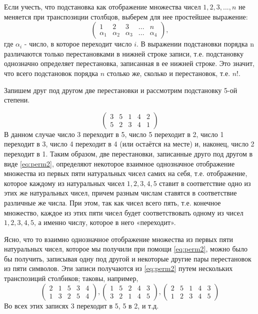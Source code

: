 \documentclass[a4paper,14pt]{article}
\begin{document}
Если учесть, что подстановка как отображение множества чисел $1, 2, 3,...,n$ не меняется при транспозиции столбцов, выберем для нее простейшее выражение:
\[
\begin{pmatrix}
1 & 2 & 3 & ... & n \\
\alpha_{1} & \alpha_{2} & \alpha_{3} & ... & \alpha_{4}
\end{pmatrix},
\] где $\alpha_i$ - число, в которое переходит число $i$.
В выражении подстановки порядка n различаются только перестановками в нижней строке записи, т.е. подстановку однозначно определяет перестановка, записанная в ее нижней строке. Это значит, что всего подстановок порядка $n$ столько же, сколько и перестановок, т.е. $n!$.
\begin{exmp}
	Запишем друг под другом две перестановки и рассмотрим подстановку 5-ой степени.
	
	\begin{equation}\label{eq:perm2}
	\begin{pmatrix}
	3 & 5 & 1 & 4 & 2 \\
	5 & 2 & 3 & 4 & 1
	\end{pmatrix}
	\end{equation}
	В данном случае число 3 переходит в 5, число 5 переходит в 2, число 1 переходит в 3, число 4 переходит в 4 (или остаётся на месте) и, наконец, число 2 переходит в 1. Таким образом, две перестановки, записанные друго под другом в виде \eqref{eq:perm2}, определяют некоторое взаимное однозначное отображение множества из первых пяти натуральных чисел самих на себя, т.е. отображение, которое каждому из натуральных чисел $1, 2, 3, 4, 5$ ставит в соответствие одно из этих же натуральных чисел, причем разным числам ставятся в соответствие различные же числа. При этом, так как чисел всего пять, т.е. конечное множество, каждое из этих пяти чисел будет соответствовать одному из чисел $1, 2, 3, 4, 5$, а именно числу, которое в него «переходит».
	
	Ясно, что то взаимно однозначное отображение множества из первых пяти натуральных чисел, которое мы получили при помощи \eqref{eq:perm2}, можно было бы получить, записывая одну под другой и некоторые другие пары перестановок из пяти символов. Эти записи получаются из \eqref{eq:perm2} путем нескольких транспозиций столбиков; таковы, например,
	\begin{equation}\label{eq:perm3}
	\begin{pmatrix}
	2 & 1 & 5 & 3 & 4 \\
	1 & 3 & 2 & 5 & 4
	\end{pmatrix},
	\begin{pmatrix}
	1 & 5 & 2 & 4 & 3 \\
	3 & 2 & 1 & 4 & 5
	\end{pmatrix},
	\begin{pmatrix}
	2 & 5 & 1 & 4 & 3 \\
	1 & 2 & 3 & 4 & 5
	\end{pmatrix}
	\end{equation}
	Во всех этих записях 3 переходит в 5, 5 в 2, и т.д.
	

\end{exmp}
\end{document}
